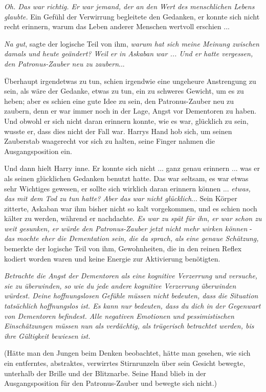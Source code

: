 \emph{Oh. Das war richtig. Er war jemand, der an den Wert des menschlichen
Lebens glaubte.} Ein Gefühl der Verwirrung begleitete den Gedanken, er konnte
sich nicht recht erinnern, warum das Leben anderer Menschen wertvoll erschien ...

\emph{Na gut}, sagte der logische Teil von ihm, \emph{warum hat sich meine
Meinung zwischen damals und heute geändert? Weil er in Askaban war ... Und er
hatte vergessen, den Patronus-Zauber neu zu zaubern}...

Überhaupt irgendetwas zu tun, schien irgendwie eine ungeheure Anstrengung zu
sein, als wäre der Gedanke, etwas zu tun, ein zu schweres Gewicht, um es zu
heben; aber es schien eine gute Idee zu sein, den Patronus-Zauber neu zu
zaubern, denn er war immer noch in der Lage, Angst vor Dementoren zu haben. Und
obwohl er sich nicht daran erinnern konnte, wie es war, glücklich zu sein,
wusste er, dass dies nicht der Fall war. Harrys Hand hob sich, um seinen
Zauberstab waagerecht vor sich zu halten, seine Finger nahmen die
Ausgangsposition ein.

Und dann hielt Harry inne. Er konnte sich nicht ... ganz genau erinnern ... was
er als seinen glücklichen Gedanken benutzt hatte. Das war seltsam, es war etwas
sehr Wichtiges gewesen, er sollte sich wirklich daran erinnern können ...
\emph{etwas, das mit dem Tod zu tun hatte? Aber das war nicht glücklich}... Sein
Körper zitterte, Askaban war ihm bisher nicht so kalt vorgekommen, und es schien
noch kälter zu werden, während er nachdachte. \emph{Es war zu spät für ihn, er
war schon zu weit gesunken, er würde den Patronus-Zauber jetzt nicht mehr wirken
können} - \emph{das mochte eher die Dementation sein, die da sprach, als eine
genaue Schätzung,} bemerkte der logische Teil von ihm, Gewohnheiten, die in den
reinen Reflex kodiert worden waren und keine Energie zur Aktivierung benötigten.

\emph{Betrachte die Angst der Dementoren als eine kognitive Verzerrung und
versuche, sie zu überwinden, so wie du jede andere kognitive Verzerrung
überwinden würdest. Deine hoffnungslosen Gefühle müssen nicht bedeuten, dass die
Situation tatsächlich hoffnungslos ist. Es kann nur bedeuten, dass du dich in
der Gegenwart von Dementoren befindest. Alle negativen Emotionen und
pessimistischen Einschätzungen müssen nun als verdächtig, als trügerisch
betrachtet werden, bis ihre Gültigkeit bewiesen ist.}

(Hätte man den Jungen beim Denken beobachtet, hätte man gesehen, wie sich ein
entferntes, abstraktes, verwirrtes Stirnrunzeln über sein Gesicht bewegte,
unterhalb der Brille und der Blitznarbe. Seine Hand blieb in der
Ausgangsposition für den Patronus-Zauber und bewegte sich nicht.)

